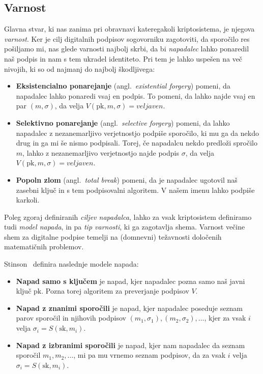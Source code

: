 \documentclass[isrm2, tisk]{fmfdelo}
\begin{document}
\subsection{Varnost}
Glavna stvar, ki nas zanima pri obravnavi kateregakoli kriptosistema, je njegova \textit{varnost}. 
Ker je cilj digitalnih podpisov sogovorniku zagotoviti, da sporočilo res pošiljamo mi, nas glede 
varnosti najbolj skrbi, da bi \textit{napadalec} lahko ponaredil naš podpis in nam s tem ukradel 
identiteto. Pri tem je lahko uspešen na več nivojih, ki so od najmanj do najbolj škodljivega:

\begin{itemize}
    \item \textbf{Eksistencialno ponarejanje} (angl.\ \textit{existential forgery}) pomeni, da napadalec 
        lahko ponaredi vsaj en podpis. To pomeni, da lahko najde vsaj en par $(m, \sigma)$, da 
        velja $V(\text{pk}, m, \sigma) = veljaven$.
    \item \textbf{Selektivno ponarejanje} (angl.\ \textit{selective forgery}) pomeni, da lahko napadalec 
        z nezanemarljivo verjetnostjo podpiše sporočilo, ki mu ga da nekdo drug in ga mi še nismo 
        podpisali. Torej, če napadalcu nekdo predloži spročilo $m$, lahko z nezanemarljivo verjetnostjo 
        najde podpis $\sigma$, da velja $V(\text{pk}, m, \sigma) = veljaven$.
    \item \textbf{Popoln zlom} (angl.\ \textit{total break}) pomeni, da je napadalec ugotovil naš 
        zasebni ključ in s tem podpisovalni algoritem. V našem imenu lahko podpiše karkoli.
\end{itemize}

Poleg zgoraj definiranih \textit{ciljev napadalca}, lahko za vsak kriptosistem definiramo tudi
\textit{model napada}, in pa \textit{tip varnosti}, ki ga zagotavlja shema. Varnost večine shem za 
digitalne podpise temelji na (domnevni) težavnosti določenih matematičnih problemov.

Stinson~\cite{stinson2023crypto} definira naslednje modele napada:
\begin{itemize}
    \item \textbf{Napad samo s ključem} je napad, kjer napadalec pozna samo naš javni ključ $\text{pk}$. 
        Pozna torej algoritem za preverjanje podpisov $V$.
    \item \textbf{Napad z znanimi sporočili} je napad, kjer napadalec poseduje seznam parov sporočil 
        in njihovih podpisov $(m_1, \sigma_1), (m_2, \sigma_2), \dots$, kjer za vsak $i$ velja 
        $\sigma_i = S(\text{sk}, m_i)$.
    \item \textbf{Napad z izbranimi sporočili} je napad, kjer nam napadalec da seznam sporočil $m_1,
        m_2, \dots$, mi pa mu vrnemo seznam podpisov, da za vsak $i$ velja $\sigma_i = S(\text{sk}, 
        m_i)$.
\end{itemize}
\end{document}

